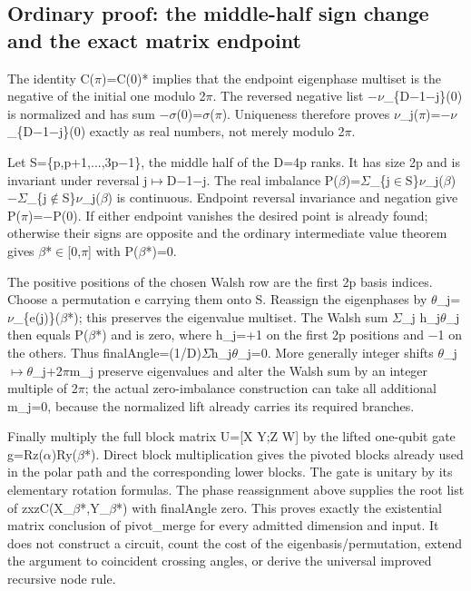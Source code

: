 \documentclass[11pt,a4paper]{article}
\begin{document}
\subsection{Ordinary proof: the middle-half sign change and the exact matrix endpoint}
The identity C(\ensuremath{\pi})=C(0)* implies that the endpoint eigenphase multiset is the negative of the initial one modulo 2\ensuremath{\pi}. The reversed negative list \ensuremath{-}\ensuremath{\nu}\_\{D\ensuremath{-}1\ensuremath{-}j\}(0) is normalized and has sum \ensuremath{-}\ensuremath{\sigma}(0)=\ensuremath{\sigma}(\ensuremath{\pi}). Uniqueness therefore proves \ensuremath{\nu}\_j(\ensuremath{\pi})=\ensuremath{-}\ensuremath{\nu}\_\{D\ensuremath{-}1\ensuremath{-}j\}(0) exactly as real numbers, not merely modulo 2\ensuremath{\pi}.

Let S=\{p,p+1,...,3p\ensuremath{-}1\}, the middle half of the D=4p ranks. It has size 2p and is invariant under reversal j\ensuremath{\mapsto}D\ensuremath{-}1\ensuremath{-}j. The real imbalance P(\ensuremath{\beta})=\ensuremath{\Sigma}\_\{j\ensuremath{\in}S\}\ensuremath{\nu}\_j(\ensuremath{\beta})\ensuremath{-}\ensuremath{\Sigma}\_\{j\ensuremath{\notin}S\}\ensuremath{\nu}\_j(\ensuremath{\beta}) is continuous. Endpoint reversal invariance and negation give P(\ensuremath{\pi})=\ensuremath{-}P(0). If either endpoint vanishes the desired point is already found; otherwise their signs are opposite and the ordinary intermediate value theorem gives \ensuremath{\beta}*\ensuremath{\in}[0,\ensuremath{\pi}] with P(\ensuremath{\beta}*)=0.

The positive positions of the chosen Walsh row are the first 2p basis indices. Choose a permutation e carrying them onto S. Reassign the eigenphases by \ensuremath{\theta}\_j=\ensuremath{\nu}\_\{e(j)\}(\ensuremath{\beta}*); this preserves the eigenvalue multiset. The Walsh sum \ensuremath{\Sigma}\_j h\_j\ensuremath{\theta}\_j then equals P(\ensuremath{\beta}*) and is zero, where h\_j=+1 on the first 2p positions and \ensuremath{-}1 on the others. Thus finalAngle=(1/D)\ensuremath{\Sigma}h\_j\ensuremath{\theta}\_j=0. More generally integer shifts \ensuremath{\theta}\_j\ensuremath{\mapsto}\ensuremath{\theta}\_j+2\ensuremath{\pi}m\_j preserve eigenvalues and alter the Walsh sum by an integer multiple of 2\ensuremath{\pi}; the actual zero-imbalance construction can take all additional m\_j=0, because the normalized lift already carries its required branches.

Finally multiply the full block matrix U=[X Y;Z W] by the lifted one-qubit gate g=Rz(\ensuremath{\alpha})Ry(\ensuremath{\beta}*). Direct block multiplication gives the pivoted blocks already used in the polar path and the corresponding lower blocks. The gate is unitary by its elementary rotation formulas. The phase reassignment above supplies the root list of zxzC(X\_\ensuremath{\beta}*,Y\_\ensuremath{\beta}*) with finalAngle zero. This proves exactly the existential matrix conclusion of pivot\_merge for every admitted dimension and input. It does not construct a circuit, count the cost of the eigenbasis/permutation, extend the argument to coincident crossing angles, or derive the universal improved recursive node rule.
\end{document}
